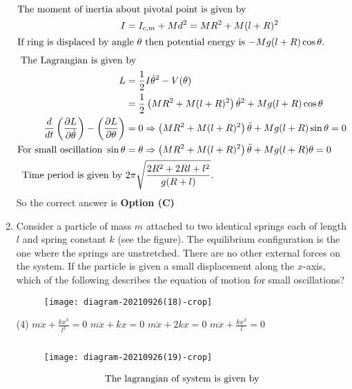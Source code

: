 \begin{enumerate}
\begin{tasks}
\end{tasks}
\begin{answer}
\begin{align*}
\intertext{The moment of inertia about pivotal point is given by}
I&=I_{c, m}+M d^{2}=M R^{2}+M(l+R)^{2}\\
\intertext{If ring is displaced by angle $\theta$ then potential energy is $-M g(l+R) \cos \theta$.}
\intertext{ The Lagrangian is given by}
L&=\frac{1}{2} I \dot{\theta}^{2}-V(\theta)\\&=\frac{1}{2}\left(M R^{2}+M(l+R)^{2}\right) \dot{\theta}^{2}+M g(l+R) \cos \theta\\
\frac{d}{d t}\left(\frac{\partial L}{\partial \dot{\theta}}\right)-\left(\frac{\partial L}{\partial \theta}\right)&=0 \Rightarrow\left(M R^{2}+M(l+R)^{2}\right) \ddot{\theta}+M g(l+R) \sin \theta=0\\
\text{For small oscillation }\sin \theta&=\theta \Rightarrow\left(M R^{2}+M(l+R)^{2}\right) \ddot{\theta}+M g(l+R) \theta=0\\
\text{Time period is given by }&2 \pi \sqrt{\frac{2 R^{2}+2 R l+l^{2}}{g(R+l)}}.
\end{align*}
So the correct answer is \textbf{Option (C)}
\end{answer}	
\item Consider a particle of mass $m$ attached to two identical springs each of length $l$ and spring constant $k$ (see the figure). The equilibrium configuration is the one where the springs are unstretched. There are no other external forces on the system. If the particle is given a small displacement along the $x$-axis, which of the following describes the equation of motion for small oscillations?
{}
\begin{figure}[H]
\centering
\texttt{[image: diagram-20210926(18)-crop]}
\end{figure}
\begin{tasks}(4)
\task[\textbf{A.}] $m \ddot{x}+\frac{k x^{3}}{l^{2}}=0$
\task[\textbf{B.}]  $m \ddot{x}+k x=0$
\task[\textbf{C.}] $m \ddot{x}+2 k x=0$
\task[\textbf{D.}] $m \ddot{x}+\frac{k x^{2}}{l}=0$
\end{tasks}
\begin{answer}$\left. \right. $
\begin{figure}[H]
	\centering
	\texttt{[image: diagram-20210926(19)-crop]}
\end{figure}
\begin{align*}
\intertext{The lagrangian of system is given by}

\end{align*}
\end{answer}
\end{enumerate}
